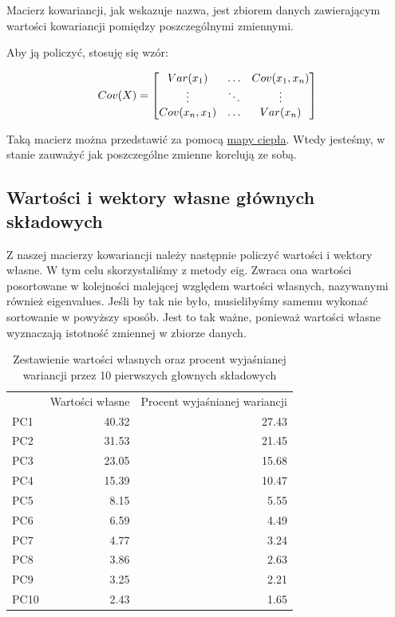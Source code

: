 \documentclass[12pt, a4paper]{article}
\begin{document}
        Macierz kowariancji, jak wskazuje nazwa, jest zbiorem danych zawierającym wartości kowariancji pomiędzy
        poszczególnymi zmiennymi.

        Aby ją policzyć, stosuję się wzór:

        \begin{equation}
            Cov(X) = \begin{bmatrix} Var(x_1) & \hdots & Cov(x_1, x_n)\\ \vdots & \ddots & \vdots\\ Cov(x_n, x_1) & \hdots & Var(x_n) \end{bmatrix}
        \end{equation}

        Taką macierz można przedstawić za pomocą \href{file:./graphics/cov.png}{mapy ciepła}. Wtedy jesteśmy, w stanie zauważyć
        jak poszczególne zmienne korelują ze sobą.

    \subsection{Wartości i wektory własne głównych składowych}
        
        Z naszej macierzy kowariancji należy następnie policzyć wartości i wektory własne. W tym celu skorzystaliśmy z
        metody eig. Zwraca ona wartości posortowane w kolejności malejącej względem wartości własnych, nazywanymi również eigenvalues.
        Jeśli by tak nie było, musielibyśmy samemu wykonać sortowanie w powyższy sposób. Jest to tak ważne, ponieważ wartości własne wyznaczają
        istotność zmiennej w zbiorze danych.

        \begin{table}
            \centering
            \caption{Zestawienie wartości własnych oraz procent wyjaśnianej wariancji przez 10 pierwszych głownych składowych}
            \begin{tabular}{lrr}
                & Wartości własne & Procent wyjaśnianej wariancji \\
                PC1 & 40.32 & 27.43 \\
                PC2 & 31.53 & 21.45 \\
                PC3 & 23.05 & 15.68 \\
                PC4 & 15.39 & 10.47 \\
                PC5 & 8.15 & 5.55 \\
                PC6 & 6.59 & 4.49 \\
                PC7 & 4.77 & 3.24 \\
                PC8 & 3.86 & 2.63 \\
                PC9 & 3.25 & 2.21 \\
                PC10 & 2.43 & 1.65 \\
            \end{tabular}
        \end{table}
\end{document}
